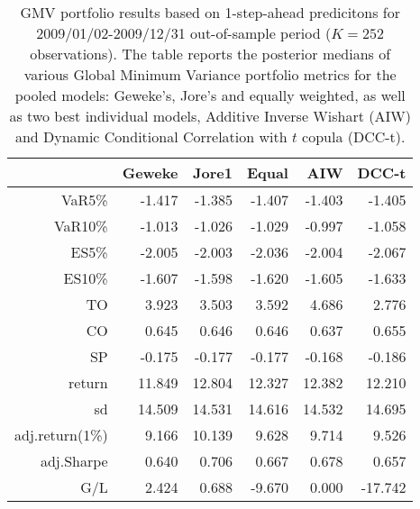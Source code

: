 \begin{table}[ht]
\centering
\caption{GMV portfolio results based on 1-step-ahead predicitons 
             for  2009/01/02-2009/12/31 out-of-sample period ($K=252$ observations).
             The table reports the posterior medians of various Global Minimum
             Variance portfolio metrics for the pooled models: 
             Geweke's, Jore's and equally weighted, 
             as well as two best individual models, Additive Inverse Wishart (AIW) and 
             Dynamic Conditional Correlation with $t$ copula (DCC-t).} 
\label{table:gmvfull2}
\begin{tabular}{rrrrrr}
  \hline
 & Geweke & Jore1 & Equal & AIW & DCC-t \\ 
  \hline
VaR5\% & -1.417 & -1.385 & -1.407 & -1.403 & -1.405 \\ 
  VaR10\% & -1.013 & -1.026 & -1.029 & -0.997 & -1.058 \\ 
  ES5\% & -2.005 & -2.003 & -2.036 & -2.004 & -2.067 \\ 
  ES10\% & -1.607 & -1.598 & -1.620 & -1.605 & -1.633 \\ 
  TO & 3.923 & 3.503 & 3.592 & 4.686 & 2.776 \\ 
  CO & 0.645 & 0.646 & 0.646 & 0.637 & 0.655 \\ 
  SP & -0.175 & -0.177 & -0.177 & -0.168 & -0.186 \\ 
   \hline
return & 11.849 & 12.804 & 12.327 & 12.382 & 12.210 \\ 
  sd & 14.509 & 14.531 & 14.616 & 14.532 & 14.695 \\ 
  adj.return(1\%) & 9.166 & 10.139 & 9.628 & 9.714 & 9.526 \\ 
  adj.Sharpe & 0.640 & 0.706 & 0.667 & 0.678 & 0.657 \\ 
  G/L & 2.424 & 0.688 & -9.670 & 0.000 & -17.742 \\ 
   \hline
\end{tabular}
\end{table}
